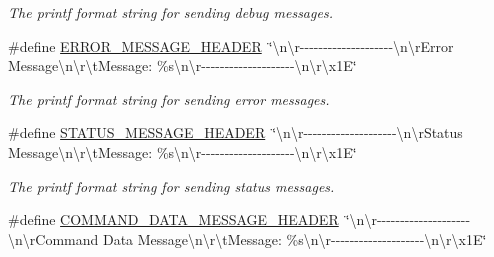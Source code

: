 \begin{DoxyCompactItemize}
\begin{DoxyCompactList}\small\item\em The printf format string for sending debug messages. \end{DoxyCompactList}\item 
\hypertarget{group__tekdaqc__communication_ga6ea1aa40205a4de746a611315727ab7d}{\#define \hyperlink{group__tekdaqc__communication_ga6ea1aa40205a4de746a611315727ab7d}{E\-R\-R\-O\-R\-\_\-\-M\-E\-S\-S\-A\-G\-E\-\_\-\-H\-E\-A\-D\-E\-R}~\char`\"{}\textbackslash{}n\textbackslash{}r-\/-\/-\/-\/-\/-\/-\/-\/-\/-\/-\/-\/-\/-\/-\/-\/-\/-\/-\/-\/\textbackslash{}n\textbackslash{}r\-Error Message\textbackslash{}n\textbackslash{}r\textbackslash{}t\-Message\-: \%s\textbackslash{}n\textbackslash{}r-\/-\/-\/-\/-\/-\/-\/-\/-\/-\/-\/-\/-\/-\/-\/-\/-\/-\/-\/-\/\textbackslash{}n\textbackslash{}r\textbackslash{}x1\-E\char`\"{}}\label{group__tekdaqc__communication_ga6ea1aa40205a4de746a611315727ab7d}

\begin{DoxyCompactList}\small\item\em The printf format string for sending error messages. \end{DoxyCompactList}\item 
\hypertarget{group__tekdaqc__communication_gaed5fb544cd079f2880ed56a2b4ed7015}{\#define \hyperlink{group__tekdaqc__communication_gaed5fb544cd079f2880ed56a2b4ed7015}{S\-T\-A\-T\-U\-S\-\_\-\-M\-E\-S\-S\-A\-G\-E\-\_\-\-H\-E\-A\-D\-E\-R}~\char`\"{}\textbackslash{}n\textbackslash{}r-\/-\/-\/-\/-\/-\/-\/-\/-\/-\/-\/-\/-\/-\/-\/-\/-\/-\/-\/-\/\textbackslash{}n\textbackslash{}r\-Status Message\textbackslash{}n\textbackslash{}r\textbackslash{}t\-Message\-: \%s\textbackslash{}n\textbackslash{}r-\/-\/-\/-\/-\/-\/-\/-\/-\/-\/-\/-\/-\/-\/-\/-\/-\/-\/-\/-\/\textbackslash{}n\textbackslash{}r\textbackslash{}x1\-E\char`\"{}}\label{group__tekdaqc__communication_gaed5fb544cd079f2880ed56a2b4ed7015}

\begin{DoxyCompactList}\small\item\em The printf format string for sending status messages. \end{DoxyCompactList}\item 
\hypertarget{group__tekdaqc__communication_ga95b3bdb3aedb1c7a2a27f0aa3c81b845}{\#define \hyperlink{group__tekdaqc__communication_ga95b3bdb3aedb1c7a2a27f0aa3c81b845}{C\-O\-M\-M\-A\-N\-D\-\_\-\-D\-A\-T\-A\-\_\-\-M\-E\-S\-S\-A\-G\-E\-\_\-\-H\-E\-A\-D\-E\-R}~\char`\"{}\textbackslash{}n\textbackslash{}r-\/-\/-\/-\/-\/-\/-\/-\/-\/-\/-\/-\/-\/-\/-\/-\/-\/-\/-\/-\/\textbackslash{}n\textbackslash{}r\-Command Data Message\textbackslash{}n\textbackslash{}r\textbackslash{}t\-Message\-: \%s\textbackslash{}n\textbackslash{}r-\/-\/-\/-\/-\/-\/-\/-\/-\/-\/-\/-\/-\/-\/-\/-\/-\/-\/-\/-\/\textbackslash{}n\textbackslash{}r\textbackslash{}x1\-E\char`\"{}}\label{group__tekdaqc__communication_ga95b3bdb3aedb1c7a2a27f0aa3c81b845}


\end{DoxyCompactItemize}
